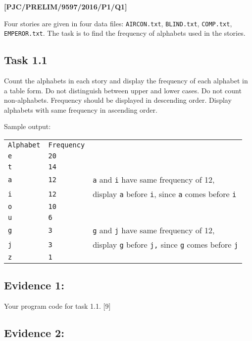 \item \textbf{{[}PJC/PRELIM/9597/2016/P1/Q1{]} }

Four stories are given in four data files: \texttt{AIRCON.txt}, \texttt{BLIND.txt},
\texttt{COMP.txt}, \texttt{EMPEROR.txt}. The task is to find the frequency
of alphabets used in the stories. 

\subsection*{Task 1.1 }

Count the alphabets in each story and display the frequency of each
alphabet in a table form. Do not distinguish between upper and lower
cases. Do not count non-alphabets. Frequency should be displayed in
descending order. Display alphabets with same frequency in ascending
order. 

Sample output: 
\noindent \begin{center}
\begin{tabular}{lll}
\texttt{Alphabet} & \texttt{Frequency} & \tabularnewline
\texttt{e} & \texttt{20} & \tabularnewline
\texttt{t} & \texttt{14} & \tabularnewline
\cline{3-3} 
\texttt{a} & \multicolumn{1}{l|}{\texttt{12}} & \multicolumn{1}{l|}{\texttt{a} and \texttt{i} have same frequency of 12,}\tabularnewline
\texttt{i} & \multicolumn{1}{l|}{\texttt{12}} & \multicolumn{1}{l|}{display \texttt{a} before \texttt{i}, since \texttt{a} comes before
\texttt{i}}\tabularnewline
\cline{3-3} 
\texttt{o} & \texttt{10} & \tabularnewline
\texttt{u} & \texttt{6} & \tabularnewline
\cline{3-3} 
\texttt{g} & \multicolumn{1}{l|}{\texttt{3}} & \multicolumn{1}{l|}{\texttt{g} and \texttt{j} have same frequency of 12,}\tabularnewline
\texttt{j} & \multicolumn{1}{l|}{\texttt{3}} & \multicolumn{1}{l|}{display \texttt{g} before \texttt{j,} since \texttt{g} comes before
\texttt{j}}\tabularnewline
\cline{3-3} 
\texttt{z} & \texttt{1} & \tabularnewline
\end{tabular}
\par\end{center}

\subsection*{Evidence 1: }

Your program code for task 1.1.\hfill{} {[}9{]}

\subsection*{Evidence 2: }

